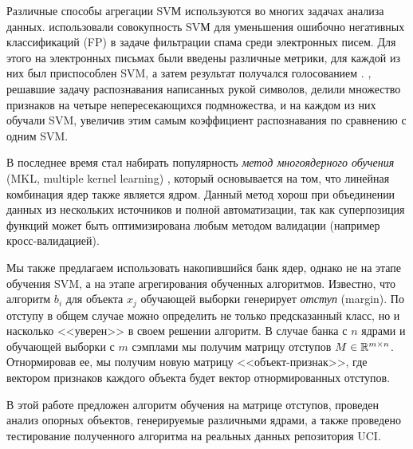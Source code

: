 \documentclass[a4paper, 10pt]{article}
\begin{document}
\begin{multicols}{2}
	Различные способы агрегации SVМ используются во многих задачах анализа данных. 
	 использовали совокупность SVМ для уменьшения ошибочно негативных классификаций (FP) в задаче фильтрации спама среди электронных писем. 
	Для этого на электронных письмах были введены различные метрики, для каждой из них был приспособлен SVM, а затем результат получался голосованием \cite{Kittler1996}. 
	, решавшие задачу распознавания написанных рукой символов, делили множество признаков на четыре непересекающихся подмножества, и на каждом из них обучали SVM, увеличив этим самым коэффициент распознавания по сравнению с одним SVM.
	
	В последнее время стал набирать популярность \emph{метод многоядерного обучения} (MKL, multiple kernel learning) \cite{Dyrba2015} \cite{Bucak2014}\cite{Althloothi2014}, который основывается на том, что линейная комбинация ядер также является ядром. Данный метод хорош при объединении данных из нескольких источников и полной автоматизации, так как суперпозиция функций может быть оптимизирована любым методом валидации (например кросс-валидацией).
	 
	
	Мы также предлагаем использовать накопившийся банк ядер, однако не на этапе обучения SVM, а на этапе агрегирования обученных алгоритмов. Известно, что алгоритм $b_i$ для объекта $x_j$ обучающей выборки генерирует \emph{отступ} (margin). По отступу в общем случае можно определить не только предсказанный класс, но и насколько <<уверен>> в своем решении алгоритм. В случае банка с $n$ ядрами и обучающей выборки с $m$ сэмплами
	мы получим матрицу отступов $M \in \mathbb{R}^{m\times n}$. Отнормировав ее, мы получим новую матрицу <<объект-признак>>, где вектором признаков каждого объекта будет вектор отнормированных отступов.
	
	В этой работе предложен алгоритм обучения на матрице отступов, проведен анализ опорных объектов, генерируемые различными ядрами, а также проведено тестирование полученного алгоритма на реальных данных репозитория UCI. 

\nocite{*}
\printbibliography
\end{multicols}
\end{document}
